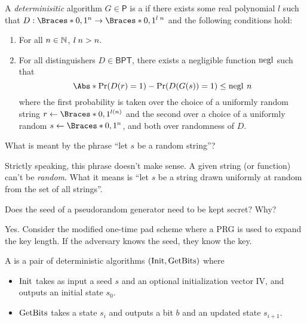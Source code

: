 \documentclass[a5paper]{article}
\begin{document}
\begin{definition}
	A \textit{determinisitic} algorithm $G\in\mathsf{P}$ is a  if there exists some real polynomial $l$ such that
  $D:\braces{0,1}^n\to\braces{0,1}^{\apply{l}{n}}$ and the following conditions hold:
  \begin{enumerate}%
    \itemsep0em
    \item {} For all $n\in\mathbb{N}$, $l\hspace{0.23em} n>n$.
    \item {} For all distinguishers $D\in\mathsf{BPT}$,
      there exists a negligible function $\operatorname{negl}$ such that
      \begin{equation*}
        \abs{\Pr(D(r)=1)-\Pr(D(G(s))=1)}\leq \apply{\negl}{n}
      \end{equation*}
      where the first probability is taken over the choice of a uniformly random
      string $r\leftarrow\braces{0,1}^{l(n)}$ and the second over a choice of a
      uniformly random $s\leftarrow\braces{0,1}^n$, and both over randomness of
      $D$. 
  \end{enumerate}
\end{definition}

\begin{note}
  \begin{field}
    What is meant by the phrase ``let $s$ be a random string''?
  \end{field}

  \begin{field}
    Strictly speaking, this phrase doesn't make sense. A given string (or
    function) can't be \textit{random}. What it means is ``let $s$ be a string
    drawn uniformly at random from the set of all strings''.
  \end{field}
\end{note}

\begin{note}
  \begin{field}
    Does the seed of a pseudorandom generator need to be kept secret? Why?
  \end{field}

  \begin{field}
    Yes. Consider the modified one-time pad scheme where a PRG is used to expand
    the key length. If the adversary knows the seed, they know the key.
  \end{field}
\end{note}

\begin{definition}
	A  is a pair of deterministic algorithms $(\operatorname{Init},\operatorname{GetBits})$
  where 
  \begin{itemize}
    \itemsep0em
    \item $\operatorname{Init}$ takes as input a seed $s$ and an optional initialization
      vector IV, and outputs an initial state $s_0$.
    \item $\operatorname{GetBits}$ takes a state $s_i$ and outputs a bit $b$ and an updated
      state $s_{i+1}$.
  \end{itemize}
\end{definition}
\end{document}
